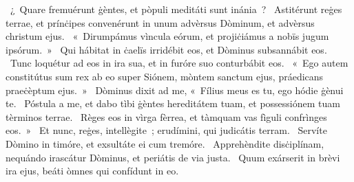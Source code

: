 ~¿~Quare fremuérunt ġèntes, et pòpuli meditáti sunt inánia~? 
~Astitérunt reġes terrae, et prínċipes convenérunt in unum advèrsus Dòminum, et advèrsus christum ejus. 
~«~Dirumpámus vìncula eórum, et projiċiámus a nobïs jugum ipsórum.~»
~Qui hábitat in ċaelïs irridébit eos, et Dòminus subsannábit eos. 
~Tunc loquétur ad eos in ira sua, et in furóre suo conturbábit eos. 
~«~Ego autem constitútus sum rex ab eo super Siónem, mòntem sanctum ejus, práedicans praeċèptum ejus.~»
~Dòminus dixit ad me, «~Fílius meus es tu, ego hódie ġènui te. 
~Póstula a me, et dabo tìbi ġèntes hereditátem tuam, et possessiónem tuam tèrminos terrae. 
~Règes eos in vìrga fèrrea, et tàmquam vas fìguli confrìnges eos.~»
~Et nunc, reġes, intellègite~; erudímini, qui judicátis terram. 
~Servíte Dòmino in timóre, et exsultáte ei cum tremóre. 
~Apprehèndite disċiplínam, nequándo irascátur Dòminus, et periátis de via justa. 
~Quum exárserit in brèvi ira ejus, beáti òmnes qui confídunt in eo. 
